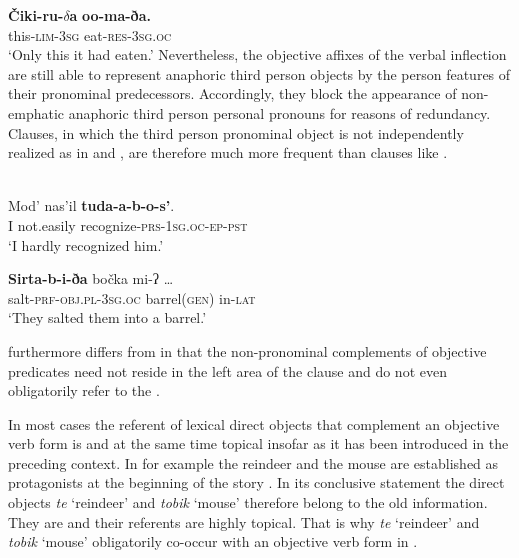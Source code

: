 \documentclass[output=paper]{LSP/langsci}
\begin{document}
\ex\label{12-wr-ex:28b}
\gll \textbf{Čiki-ru-}\textbf{$\delta $}\textbf{a} \textbf{oo-ma-ða.}\\
 this-\textsc{lim-3sg} eat-\textsc{res}-\textsc{3sg.oc}\\
\glt  ‘Only this it had eaten.’
\z
\z
Nevertheless, the objective affixes of the  verbal inflection are still able to represent anaphoric third person objects by the person features of their pronominal predecessors. Accordingly, they block the appearance of non-emphatic anaphoric third person personal pronouns for reasons of redundancy. 
Clauses, in which the third person  pronominal object is not independently realized as in  and , are therefore much more frequent than clauses like . 

\ea \label{12-wr-ex:29}
\\
\ea\label{12-wr-ex:29a}
\gll  Mod' nas'il \textbf{tuda-a-b-o-s'}.\\
 I not.easily recognize-\textsc{prs}-\textsc{1sg.oc-ep-pst}\\
\glt  ‘I hardly recognized him.’

\ex\label{12-wr-ex:29b}
\gll \textbf{Sirta-b-i-ða} bočka mi-ʔ …\\
 salt-\textsc{prf-obj.pl-3sg.oc} barrel\textsc{(gen)} in-\textsc{lat}\\
\glt ‘They salted them into a barrel.’%
\z
\z

 furthermore differs from  in that the non-pronominal complements of objective predicates need not reside in the left area of the clause and do not even obligatorily refer to the . 

In most cases the referent of lexical direct objects that complement an objective verb form is  and at the same time topical insofar as it has been introduced in the preceding context. In  for example the reindeer and the mouse are established as protagonists at the beginning of the story . In its conclusive statement  the direct objects \textit{te} ‘reindeer’ and \textit{tobik} ‘mouse’ therefore belong to the old information. They are  and their referents are highly topical. That is why \textit{te} ‘reindeer’ and \textit{tobik} ‘mouse’ obligatorily co-occur with an objective verb form in .
\end{document}
